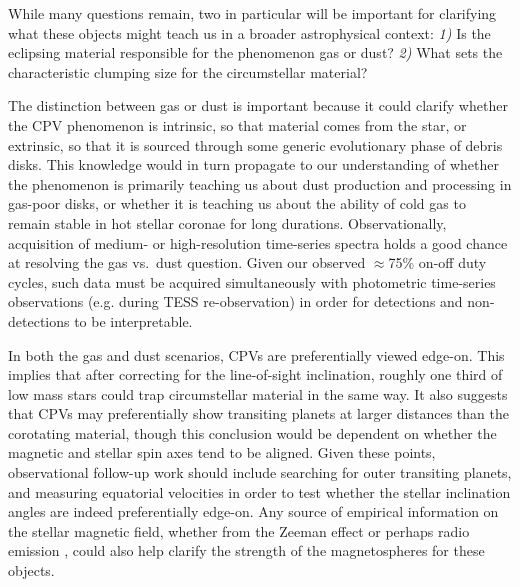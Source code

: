 \documentclass[11pt,twocolumn,tighten,linenumbers]{aastex63}
\begin{document}

While many questions remain, two in particular will be important for
clarifying what these objects might teach us in a broader
astrophysical context: {\it 1)} Is the eclipsing material responsible
for the phenomenon gas or dust?  {\it 2)} What sets the characteristic
clumping size for the circumstellar material?

The distinction between gas or dust is important because it could
clarify whether the CPV phenomenon is intrinsic, so that material
comes from the star, or extrinsic, so that it is sourced through some
generic evolutionary phase of debris disks.  This knowledge would in
turn propagate to our understanding of whether the phenomenon is
primarily teaching us about dust production and processing in gas-poor
disks, or whether it is teaching us about the ability of cold gas to
remain stable in hot stellar coronae for long durations.
Observationally, acquisition of medium- or high-resolution time-series
spectra holds a good chance at resolving the gas vs.~dust question.
Given our observed $\approx$75\% on-off duty cycles, such data must be
acquired simultaneously with photometric time-series observations
(e.g. during TESS re-observation) in order for detections and
non-detections to be interpretable.

In both the gas and dust scenarios, CPVs are preferentially viewed
edge-on.  This implies that after correcting for the line-of-sight
inclination, roughly one third of low mass stars \citep[those that
rotate rapidly enough;][]{2022AJ....163..144G} could trap
circumstellar material in the same way.  It also suggests that CPVs
may preferentially show transiting planets at larger distances than
the corotating material, though this conclusion would be dependent on
whether the magnetic and stellar spin axes tend to be aligned.  Given
these points, observational follow-up work should include searching
for outer transiting planets, and measuring equatorial velocities in
order to test whether the stellar inclination angles are indeed
preferentially edge-on.  Any source of empirical information on the
stellar magnetic field, whether from the Zeeman effect
\citep[e.g.][]{2021A&ARv..29....1K} or perhaps radio emission
\citep[e.g.][]{2015Natur.523..568H}, could also help clarify the
strength of the magnetospheres for these objects.
\end{document}
